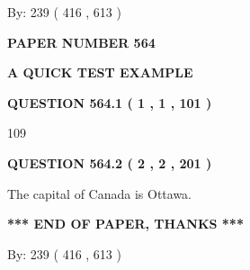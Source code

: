 \documentclass[12pt]{article}
\begin{document}
   
\hspace{1.0in} By: 
 239 ( 416 ,  613 )
   
   
   
   
\newpage 
\setcounter{page}{ 
   564001 } 
   
   
   
   
 {\textbf{ \Large{ PAPER NUMBER  564  }}}
   
   
\vspace{0.2in}
   
   
   
   
   
   
 \vspace{0.2in}
{\LARGE {\textbf{ A QUICK TEST EXAMPLE}}}
   
   
  
\vspace{0.2in}
  
{\textbf{\Large{QUESTION
564.1 
 ( 1 , 1 , 101 )
}}}
  
  
 
 
\noindent{}

109
 
 
  
\vspace{0.2in}
  
{\textbf{\Large{QUESTION
564.2 
 ( 2 , 2 , 201 )
}}}
  
  
 
 
\noindent{}
 
 
The capital of Canada is Ottawa.
 
 
 
 
   
   
 \vspace{0.2in}
 
   
   
   
   
\vspace{1.0in} 
{\textbf{\large{ *** END OF PAPER, THANKS *** }}} 
   
   
\hspace{1.0in} By: 
 239 ( 416 ,  613 )
   
   
   
   
\newpage 
\setcounter{page}{ 
   565001 } 
   
   
   
\end{document}
